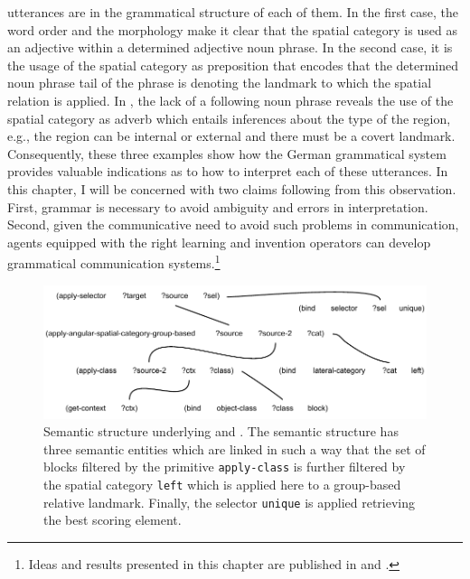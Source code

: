 utterances are in the grammatical structure of each of them. In the first case, 
the word order and the
morphology make it clear that the spatial category is used as an adjective within a
determined adjective noun phrase. In the second case, it is the usage of the spatial
category as preposition that encodes that the determined noun phrase tail of the phrase
is denoting the landmark to which the spatial relation is applied. 
In , the lack of a following noun phrase reveals the use of the spatial category as 
adverb which entails inferences about the type of the region, e.g., the region can be internal or external 
and there must be a covert landmark. Consequently, these three examples show how the German grammatical 
system provides valuable indications as to how to interpret each of these utterances.
In this chapter, I will be concerned with two claims following from this observation. First,
grammar is necessary to avoid ambiguity and errors in interpretation. Second, given the
communicative need to avoid such problems in communication, agents equipped with
the right learning and invention operators can develop grammatical communication systems.\footnote{Ideas and results presented in this chapter are 
published in \citep{spranger2012grammar} and \citep{spranger2010space}.}

\begin{figure}
\begin{center}
\includegraphics[width=1.0\columnwidth]{figs/semantic-structure-der-linke-block}
\end{center}
\caption[Semantic structure example spatial adjective]{Semantic structure underlying  and . 
The semantic structure has three semantic entities which are linked in such a way that
the set of blocks filtered by the primitive {\footnotesize\tt apply-class} is further
filtered by the spatial category {\footnotesize\tt left} which is applied here to a group-based 
relative landmark. Finally, the selector {\footnotesize\tt unique} is applied retrieving the 
best scoring element.}
\label{f:semantic-structure-1}
\end{figure}

